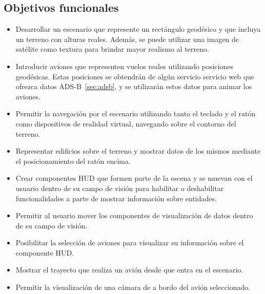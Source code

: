 \documentclass[a4paper, 11pt]{book}
\begin{document}
\subsection{Objetivos funcionales}
\begin{itemize}
	\item Desarrollar un escenario que represente un rectángulo geodésico y que incluya un terreno con alturas reales. Además, se puede utilizar una imagen de satélite como textura para brindar mayor realismo al terreno.
	\item Introducir aviones que representen vuelos reales utilizando posiciones geodésicas. Estas posiciones se obtendrán de algún servicio servicio web que ofrezca datos \textsc{ADS-B}~\ref{sec:adsb}, y se utilizarán estos datos para animar los aviones.
	\item Permitir la navegación por el escenario utilizando tanto el teclado y el ratón como dispositivos de realidad virtual, navegando sobre el contorno del terreno.
	\item Representar edificios sobre el terreno y mostrar datos de los mismos mediante el posicionamiento del ratón encima.
	\item Crear componentes \textsc{\gls{HUD}} que formen parte de la escena y se muevan con el usuario dentro de su campo de visión para habilitar o deshabilitar funcionalidades a parte de mostrar información sobre entidades.
	\item Permitir al usuario mover los componentes de visualización de datos dentro de su campo de visión.
	\item Posibilitar la selección de aviones para visualizar su información sobre el componente \textsc{\gls{HUD}}.
	\item Mostrar el trayecto que realiza un avión desde que entra en el escenario.
	\item Permitir la visualización de una cámara de a bordo del avión seleccionado.
	
\end{itemize}
\end{document}
